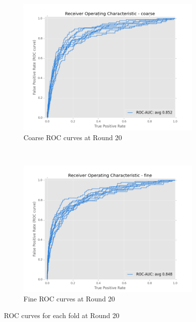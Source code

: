 \documentclass[ms]{nuthesis}
\begin{document}
\FloatBarrier
\begin{figure}[!htb]
    \centering
    \begin{subfigure}[t]{0.5\textwidth}
        \centering
        \includegraphics[width=\textwidth]{fig/RndNum_20_LogReg_RocCurves_coarse}
        \caption{Coarse ROC curves at Round 20}
    \end{subfigure}%
    ~
    \begin{subfigure}[t]{0.5\textwidth}
        \centering
        \includegraphics[width=\textwidth]{fig/RndNum_20_LogReg_RocCurves_fine}
        \caption{Fine ROC curves at Round 20}
    \end{subfigure}
    \caption{ROC curves for each fold at Round 20}
    \label{fig:rnd20LogRegRoc}
\end{figure}
\FloatBarrier
\end{document}
